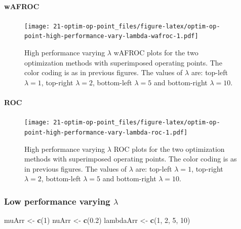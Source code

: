 \documentclass[
]{book}
\newenvironment{Shaded}{\begin{snugshade}}{\end{snugshade}}
\newcommand{\DecValTok}[1]{\textcolor[rgb]{0.00,0.00,0.81}{#1}}
\newcommand{\FloatTok}[1]{\textcolor[rgb]{0.00,0.00,0.81}{#1}}
\newcommand{\KeywordTok}[1]{\textcolor[rgb]{0.13,0.29,0.53}{\textbf{#1}}}
\newcommand{\NormalTok}[1]{#1}
\newcommand{\StringTok}[1]{\textcolor[rgb]{0.31,0.60,0.02}{#1}}
\begin{document}
\hypertarget{wafroc-7}{%
\paragraph{wAFROC}\label{wafroc-7}}

\begin{figure}
\centering
\texttt{[image: 21-optim-op-point\_files/figure-latex/optim-op-point-high-performance-vary-lambda-wafroc-1.pdf]}
\caption{\label{fig:optim-op-point-high-performance-vary-lambda-wafroc}High performance varying \(\lambda\) wAFROC plots for the two optimization methods with superimposed operating points. The color coding is as in previous figures. The values of \(\lambda\) are: top-left \(\lambda = 1\), top-right \(\lambda = 2\), bottom-left \(\lambda = 5\) and bottom-right \(\lambda = 10\).}
\end{figure}

\hypertarget{roc-7}{%
\paragraph{ROC}\label{roc-7}}

\begin{figure}
\centering
\texttt{[image: 21-optim-op-point\_files/figure-latex/optim-op-point-high-performance-vary-lambda-roc-1.pdf]}
\caption{\label{fig:optim-op-point-high-performance-vary-lambda-roc}High performance varying \(\lambda\) ROC plots for the two optimization methods with superimposed operating points. The color coding is as in previous figures. The values of \(\lambda\) are: top-left \(\lambda = 1\), top-right \(\lambda = 2\), bottom-left \(\lambda = 5\) and bottom-right \(\lambda = 10\).}
\end{figure}

\hypertarget{optim-op-point-low-performance-vary-lambda}{%
\subsubsection{\texorpdfstring{Low performance varying \(\lambda\)}{Low performance varying \textbackslash lambda}}\label{optim-op-point-low-performance-vary-lambda}}

\begin{Shaded}
\begin{Highlighting}[]
\NormalTok{muArr <-}\StringTok{ }\KeywordTok{c}\NormalTok{(}\DecValTok{1}\NormalTok{)}
\NormalTok{nuArr <-}\StringTok{ }\KeywordTok{c}\NormalTok{(}\FloatTok{0.2}\NormalTok{)}
\NormalTok{lambdaArr <-}\StringTok{ }\KeywordTok{c}\NormalTok{(}\DecValTok{1}\NormalTok{, }\DecValTok{2}\NormalTok{, }\DecValTok{5}\NormalTok{, }\DecValTok{10}\NormalTok{)}
\end{Highlighting}
\end{Shaded}
\end{document}
